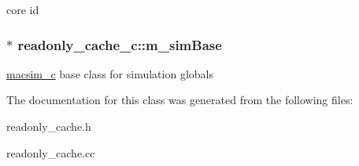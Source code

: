 \label{classreadonly__cache__c_aa9d46b912ab4891761ec80c32b78fe10}
core id \hypertarget{classreadonly__cache__c_a80c6f668796ad6a9184df23a3a2e6430}{
\subsubsection[{m\_\-simBase}]{$\ast$ {\bf readonly\_\-cache\_\-c::m\_\-simBase}}}
\label{classreadonly__cache__c_a80c6f668796ad6a9184df23a3a2e6430}
\hyperlink{classmacsim__c}{macsim\_\-c} base class for simulation globals 

The documentation for this class was generated from the following files:\begin{DoxyCompactItemize}
\item 
readonly\_\-cache.h\item 
readonly\_\-cache.cc\end{DoxyCompactItemize}
